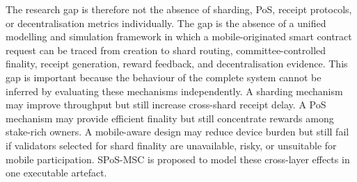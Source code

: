 \documentclass[a4paper,fleqn]{cas-sc}
\begin{document}
The research gap is therefore not the absence of sharding, PoS, receipt protocols, or decentralisation metrics individually. The gap is the absence of a unified modelling and simulation framework in which a mobile-originated smart contract request can be traced from creation to shard routing, committee-controlled finality, receipt generation, reward feedback, and decentralisation evidence. This gap is important because the behaviour of the complete system cannot be inferred by evaluating these mechanisms independently. A sharding mechanism may improve throughput but still increase cross-shard receipt delay. A PoS mechanism may provide efficient finality but still concentrate rewards among stake-rich owners. A mobile-aware design may reduce device burden but still fail if validators selected for shard finality are unavailable, risky, or unsuitable for mobile participation. SPoS-MSC is proposed to model these cross-layer effects in one executable artefact.
\end{document}
